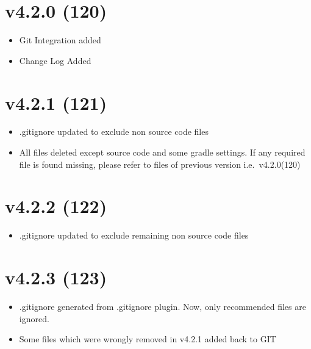 \documentclass{article}
\begin{document}
    \section{v4.2.0 (120)}\label{sec:120}
    \begin{itemize}
        \item Git Integration added
        \item Change Log Added
    \end{itemize}

    \section{v4.2.1 (121)}\label{sec:121}
    \begin{itemize}
        \item .gitignore updated to exclude non source code files
        \item All files deleted except source code and some gradle settings.
        If any required file is found missing, please refer to files of previous version i.e.\ v4.2.0(120)
    \end{itemize}

    \section{v4.2.2 (122)}\label{sec:122}
    \begin{itemize}
        \item .gitignore updated to exclude remaining non source code files
    \end{itemize}

    \section{v4.2.3 (123)}\label{sec:123}
    \begin{itemize}
        \item .gitignore generated from .gitignore plugin.
        Now, only recommended files are ignored.
        \item Some files which were wrongly removed in v4.2.1 added back to GIT
    \end{itemize}
\end{document}
